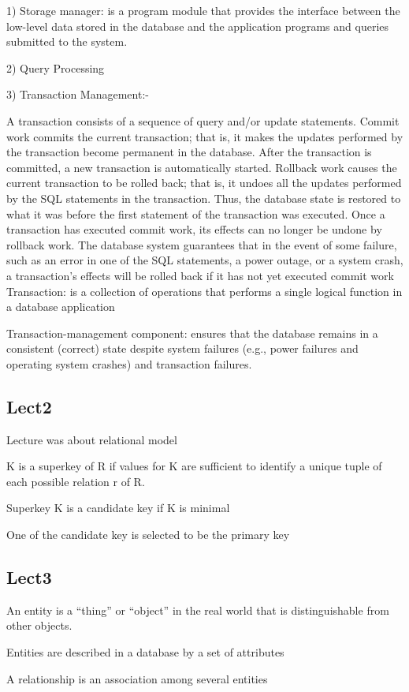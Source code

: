 \documentclass[8pt, a4paper, oneside, twocolumn]{extarticle}
\begin{document}
1) Storage manager: is a program module that provides the interface between 
the low-level data stored in the database and the application programs and 
queries submitted to the system.

2) Query Processing

3) Transaction Management:- 

A transaction consists of a sequence of query and/or update statements.
Commit work commits the current transaction; that is, it makes the updates
performed by the transaction become permanent in the database. After the
transaction is committed, a new transaction is automatically started.
Rollback work causes the current transaction to be rolled back; that is, it
undoes all the updates performed by the SQL statements in the transaction.
Thus, the database state is restored to what it was before the first statement
of the transaction was executed.
Once a transaction has executed commit work, its
effects can no longer be undone by rollback work. The database system guarantees that in the event of some failure, such as an error in one of the SQL statements,
a power outage, or a system crash, a transaction’s effects will be rolled back if it
has not yet executed commit work
Transaction: is a collection of operations that performs a single 
logical function in a database application

Transaction-management component: ensures that the database 
remains in a consistent (correct) state despite system failures (e.g., 
power failures and operating system crashes) and transaction failures.
\subsection{Lect2}
Lecture was about relational model

K is a superkey of R if values for K are sufficient to identify a unique tuple of each possible relation r of R.

Superkey K is a candidate key if K is minimal

One of the candidate key is selected to be the primary key
\subsection{Lect3}
An entity is a “thing” or “object” in the real world that is 
distinguishable from other objects. 

Entities are described in a database by a set of attributes

A relationship is an association among several entities
\end{document}
